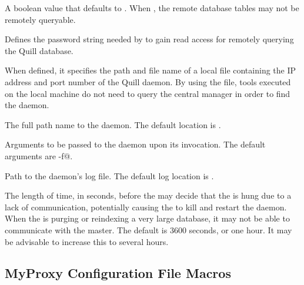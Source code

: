 \begin{description}
\label{param:QuillIsRemotelyQueryable}
\item[\Macro{QUILL\_IS\_REMOTELY\_QUERYABLE}]
  A boolean value that defaults to .
  When , the remote database tables may not be remotely
  queryable.

\label{param:QuillDBQueryPassword}
\item[\Macro{QUILL\_DB\_QUERY\_PASSWORD}]
  Defines the password string needed by  to gain read
  access for remotely querying the Quill database.

\label{param:QuillAddressFile}
\item[\Macro{QUILL\_ADDRESS\_FILE}]
  When defined, it specifies the path and file name of a local file
  containing the IP address and port number of the Quill daemon.
  By using the file, tools executed on the local machine do not need
  to query the central manager in order to find the  daemon.

\label{param:DBMSD} 
\item[\Macro{DBMSD}]
  The full path name to the  daemon.
  The default location is .

\label{param:DBMSDArgs}
\item[\Macro{DBMSD\_ARGS}]
  Arguments to be passed to the  daemon upon its invocation.
  The default arguments are \verb@-f@.

\label{param:DBMSDLog}
\item[\Macro{DBMSD\_LOG}]
  Path to the  daemon's log file.
  The default log location is .

\label{param:DBMSDNotRespondingTimeout}
\item[\Macro{DBMSD\_NOT\_RESPONDING\_TIMEOUT}]
  The length of time, in seconds, before the 
  may decide that the  is hung due to a lack of communication,
  potentially causing  the  to kill and
  restart the  daemon.
  When the  is purging or reindexing a very large database, it 
  may not be able to communicate with the master. 
  The default is 3600 seconds, or one hour. It may be
  advisable to increase this to several hours. 

\end{description}



\subsection{\label{sec:MyProxy-Config-File-Entries}MyProxy
Configuration File Macros}
 
